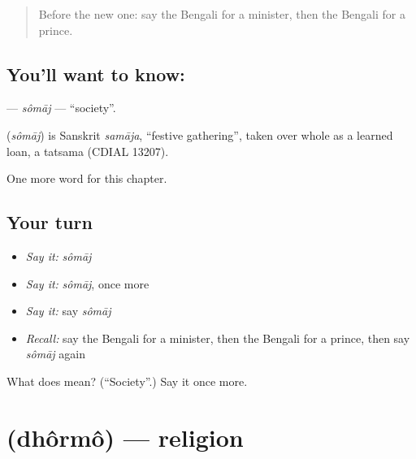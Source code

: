 \label{lesson:BN-C230-somaj}



\begin{quote}
Before the new one: say the Bengali for a minister, then the Bengali for a prince.
\end{quote}

\subsection*{You'll want to know: }
\textbf{} — \emph{sômāj} — \textquotedblleft{}society\textquotedblright{}.

\begin{cousinweb}
\textbf{} (\emph{sômāj}) is Sanskrit \emph{samāja}, \textquotedblleft{}festive gathering\textquotedblright{}, taken over whole as a learned loan, a tatsama (CDIAL 13207).
\end{cousinweb}

\begin{grammarlens}[title={What you've built}]
One more word for this chapter.
\end{grammarlens}

\subsection*{Your turn}
\begin{itemize}
\raggedright
  \item \emph{Say it:} \emph{sômāj}
  \item \emph{Say it:} \emph{sômāj}, once more
  \item \emph{Say it:} say \emph{sômāj}
  \item \emph{Recall:} say the Bengali for a minister, then the Bengali for a prince, then say \emph{sômāj} again
\end{itemize}

\begin{tcolorbox}[breakable,colback=teal!4,colframe=teal!35!black,title={Before you move on}]
What does  mean? (\textquotedblleft{}Society\textquotedblright{}.) Say it once more.
\end{tcolorbox}
\section[\texorpdfstring{\bn{ধর্ম} (dhôrmô)}{ধর্ম (dhôrmô)}]{ (dhôrmô) — religion}

\label{lesson:BN-C230-dhormo}



